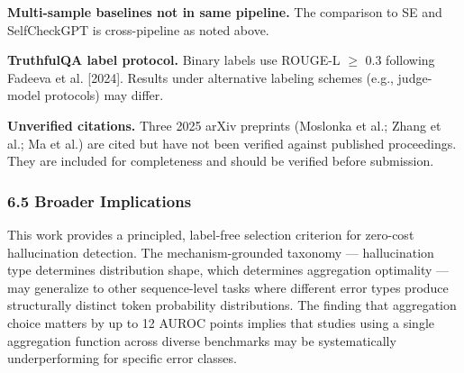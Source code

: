 \textbf{Multi-sample baselines not in same pipeline.} The comparison to SE and SelfCheckGPT is cross-pipeline as noted above.

\textbf{TruthfulQA label protocol.} Binary labels use ROUGE-L $\geq$ 0.3 following Fadeeva et al. [2024]. Results under alternative labeling schemes (e.g., judge-model protocols) may differ.

\textbf{Unverified citations.} Three 2025 arXiv preprints (Moslonka et al.; Zhang et al.; Ma et al.) are cited but have not been verified against published proceedings. They are included for completeness and should be verified before submission.

\subsubsection{6.5 Broader Implications}

This work provides a principled, label-free selection criterion for zero-cost hallucination detection. The mechanism-grounded taxonomy --- hallucination type determines distribution shape, which determines aggregation optimality --- may generalize to other sequence-level tasks where different error types produce structurally distinct token probability distributions. The finding that aggregation choice matters by up to 12 AUROC points implies that studies using a single aggregation function across diverse benchmarks may be systematically underperforming for specific error classes.

